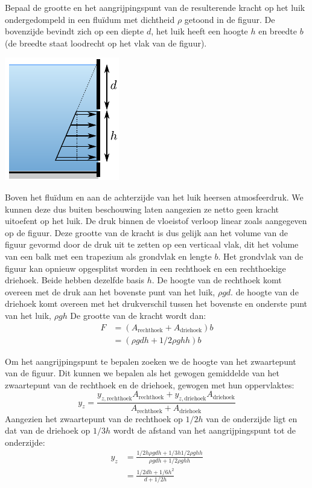 \begin{voorbeeld}
	\label{vb:luik}
	Bepaal de grootte en het aangrijpingspunt van de resulterende kracht op het luik ondergedompeld in een fluïdum met dichtheid $\rho$ getoond in de figuur. De bovenzijde bevindt zich op een diepte $d$, het luik heeft een hoogte $h$ en breedte $b$ (de breedte staat loodrecht op het vlak van de figuur).
	\begin{center}
		\includegraphics{fig/hydrostatica/kracht_op_luik}
	\end{center}
	Boven het fluïdum en aan de achterzijde van het luik heersen atmosfeerdruk. We kunnen deze dus buiten beschouwing laten aangezien ze netto geen kracht uitoefent op het luik. De druk binnen de vloeistof verloop linear zoals aangegeven op de figuur. Deze grootte van de kracht is dus gelijk aan het volume van de figuur gevormd door de druk uit te zetten op een verticaal vlak, dit het volume van een balk met een trapezium als grondvlak en lengte $b$. Het grondvlak van de figuur kan opnieuw opgesplitst worden in een rechthoek en een rechthoekige driehoek. Beide hebben dezelfde basis $h$. De hoogte van de rechthoek komt overeen met de druk aan het bovenste punt van het luik, $\rho g d$. de hoogte van de driehoek komt overeen met het drukverschil tussen het bovenste en onderste punt van het luik, $\rho g h$ De grootte van de kracht wordt dan:
	\begin{align*}
		F &= \left( A_{\text{rechthoek}} + A_{\text{driehoek}} \right) b\\
		  &= \left( \rho g d h + 1/2 \rho g h h \right) b
	\end{align*}

	Om het aangrijpingspunt te bepalen zoeken we de hoogte van het zwaartepunt van de figuur. Dit kunnen we bepalen als het gewogen gemiddelde van het zwaartepunt van de rechthoek en de driehoek, gewogen met hun oppervlaktes:
	\begin{equation*}
		y_z = \frac{ y_{z,\text{rechthoek}} A_{\text{rechthoek}} + y_{z,\text{driehoek}} A_{\text{driehoek}}}{A_{\text{rechthoek}} + A_{\text{driehoek}}}
	\end{equation*}
	Aangezien het zwaartepunt van de rechthoek op $1/2 h$ van de onderzijde ligt en dat van de driehoek op $1/3 h$ wordt de afstand van het aangrijpingspunt tot de onderzijde:
	\begin{align*}
		y_z &= \frac{ 1/2 h \rho g d h + 1/3 h 1/2 \rho g h h}{\rho g d h + 1/2 \rho g h h} \\
		    &= \frac{ 1/2 d h + 1/6 h^2}{d + 1/2 h}
	\end{align*}
\end{voorbeeld}

